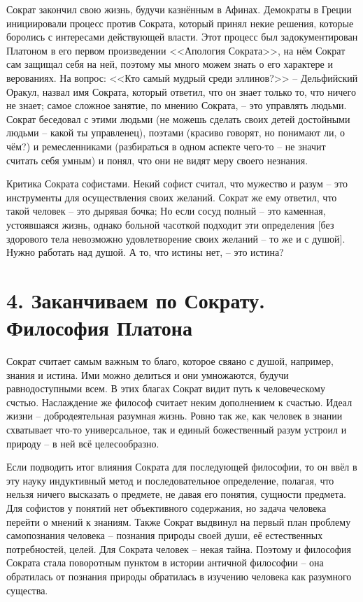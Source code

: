 \documentclass[a4paper, 12pt]{article} %
\begin{document}
 Сократ закончил свою жизнь, будучи казнённым в Афинах. Демократы в Греции инициировали процесс против Сократа, который принял некие решения, которые боролись с интересами действующей власти. Этот процесс был задокументирован Платоном в его первом произведении <<Апология Сократа>>, на нём Сократ сам защищал себя на ней, поэтому мы много можем знать о его характере и верованиях. На вопрос: <<Кто самый мудрый среди эллинов?>> -- Дельфийский Оракул, назвал имя Сократа, который ответил, что он знает только то, что ничего не знает; самое сложное занятие, по мнению Сократа, -- это управлять людьми. Сократ беседовал с этими людьми (не можешь сделать своих детей достойными людьми -- какой ты управленец), поэтами (красиво говорят, но понимают ли, о чём?) и ремесленниками (разбираться в одном аспекте чего-то -- не значит считать себя умным) и понял, что они не видят меру своего незнания.
 
Критика Сократа софистами. Некий софист считал, что мужество и разум -- это инструменты для осуществления своих желаний. Сократ же ему ответил, что такой человек -- это дырявая бочка; Но если сосуд полный -- это каменная, устоявшаяся жизнь, однако больной часоткой подходит эти определения [без здорового тела невозможно удовлетворение своих желаний -- то же и с душой]. Нужно работать над душой. А то, что истины нет, -- это истина? 

\section*{4. Заканчиваем по Сократу. Философия Платона}

Сократ считает самым важным то благо, которое свяано с душой, например, знания и истина. Ими можно делиться и они умножаются, будучи равнодоступными всем. В этих благах Сократ видит путь к человеческому счстью. Наслаждение же философ считает неким дополнением к счастью. Идеал жизни -- добродеятельная разумная жизнь. Ровно так же, как человек в знании схватывает что-то универсальное, так и единый божественный разум устроил и природу -- в ней всё целесообразно.


Если подводить итог влияния Сократа для последующей философии, то он ввёл в эту науку индуктивный метод и последовательное определение, полагая, что нельзя ничего высказать о предмете, не давая его понятия, сущности предмета.
Для софистов у понятий нет объективного содержания, но задача человека перейти о мнений к знаниям. Также Сократ выдвинул на первый план проблему самопознания человека -- познания природы своей души, её естественных потребностей, целей. Для Сократа человек -- некая тайна. Поэтому и философия Сократа стала поворотным пунктом в истории античной философии -- она обратилась от познания природы обратилась в изучению человека как разумного существа.
\end{document}
